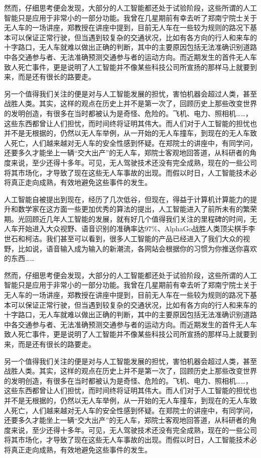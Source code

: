 \documentclass[UTF8]{XJTUthesis}
\begin{document}
然而，仔细思考便会发现，大部分的人工智能都还处于试验阶段，这些所谓的人工智能只是应用于非常小的一部分功能。我曾在几星期前有幸去听了郑南宁院士关于无人车的一场讲座，郑教授在讲座中提到，目前无人车在一些较为规则的路况下基本可以保证正常行驶，但当遇到较复杂的交通状况，比如有各方向的行人和来车的十字路口，无人车就难以做出正确的判断，其中的主要原因包括无法准确识别道路中各交通参与者、无法准确预测交通参与者的运动方向。而近期发生的首件无人车致人死亡事件，更是说明了人工智能并不像某些科技公司所宣扬的那样马上就要到来，而是还有很长的路要走。\par
另一个值得我们关注的便是对与人工智能发展的担忧，害怕机器会超过人类，甚至战胜人类。其实，这样的观点在历史上并不是第一次了，回顾历史上那些改变世界的发明创造，有很多在当时都被认为是奇怪、危险的。飞机、电力、照相机……，这些东西都曾让人们担忧，而时间终将证明其伟大。而人们对于人工智能的担忧也并不是无根据的，仍然以无人车举例，从一开始的无人车撞车，到现在的无人车致人死亡，人们越来越对无人车的安全性感到怀疑。在郑院士的讲座中，有同学问，还要多久才能坐上一辆“交大出产”的无人车，郑院士客观地回答道，从科研者的角度来说，至少还得十多年。可见，无人驾驶技术还没有完全成熟，现在的一些公司将其市场化，才导致了现在这些无人车事故的出现。而假以时日，人工智能技术必将真正走向成熟，有效地避免这些事件的发生。\par
人工智能自被提出到现在，经历了几次低谷，但现在，得益于计算机计算能力的提升和数学家在这方面一些更加优秀的算法的提出，人工智能进入了前所未有的繁荣期。光回顾近几年人工智能的发展，就有好几个值得我们关注的里程碑的时间，无人车开始进入大众视野、语音识别的准确率达$97\%$、AlphaGo战胜人类顶尖棋手李世石和柯洁。我们甚至可以看到，很多人工智能的产品已经进入了我们大众的视野，比如说，语音输入成为输入的新潮流，各网站会根据你的习惯为你推送你喜欢的东西……\par
然而，仔细思考便会发现，大部分的人工智能都还处于试验阶段，这些所谓的人工智能只是应用于非常小的一部分功能。我曾在几星期前有幸去听了郑南宁院士关于无人车的一场讲座，郑教授在讲座中提到，目前无人车在一些较为规则的路况下基本可以保证正常行驶，但当遇到较复杂的交通状况，比如有各方向的行人和来车的十字路口，无人车就难以做出正确的判断，其中的主要原因包括无法准确识别道路中各交通参与者、无法准确预测交通参与者的运动方向。而近期发生的首件无人车致人死亡事件，更是说明了人工智能并不像某些科技公司所宣扬的那样马上就要到来，而是还有很长的路要走。\par
另一个值得我们关注的便是对与人工智能发展的担忧，害怕机器会超过人类，甚至战胜人类。其实，这样的观点在历史上并不是第一次了，回顾历史上那些改变世界的发明创造，有很多在当时都被认为是奇怪、危险的。飞机、电力、照相机……，这些东西都曾让人们担忧，而时间终将证明其伟大。而人们对于人工智能的担忧也并不是无根据的，仍然以无人车举例，从一开始的无人车撞车，到现在的无人车致人死亡，人们越来越对无人车的安全性感到怀疑。在郑院士的讲座中，有同学问，还要多久才能坐上一辆“交大出产”的无人车，郑院士客观地回答道，从科研者的角度来说，至少还得十多年。可见，无人驾驶技术还没有完全成熟，现在的一些公司将其市场化，才导致了现在这些无人车事故的出现。而假以时日，人工智能技术必将真正走向成熟，有效地避免这些事件的发生。\par
\end{document}
